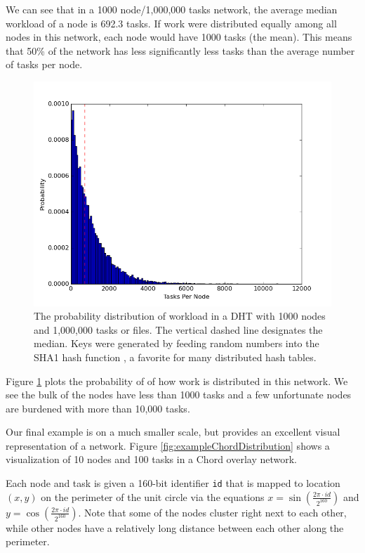 \documentclass[10pt,conference]{IEEEtran}
\begin{document}
We can see  that in a 1000 node/1,000,000 tasks network, the average median workload of a node is 692.3 tasks. 
If work were distributed equally among all nodes in this network, each node would have 1000 tasks (the mean).
This means that 50\% of the network has less significantly less tasks than the average number of tasks per node.




\begin{figure}[h!]
	\centering
	\includegraphics[width=0.9\linewidth]{figs/workloadDistribution}
	\caption[Workload Distribution in a DHT]{The probability distribution of workload in a DHT with 1000 nodes and 1,000,000 tasks or files.  The vertical dashed line designates the median.  Keys were generated by feeding random numbers into the SHA1 hash function \cite{sha1}, a favorite for many distributed hash tables.}
	\label{fig:workloadDistribution}
\end{figure}

Figure \ref{fig:workloadDistribution} plots the probability of of how work is distributed in this network.
We see the bulk of the nodes have less than 1000 tasks and a few unfortunate nodes are burdened with more than 10,000 tasks.


Our final example is on a much smaller scale, but provides an excellent visual representation of a network.
Figure \ref{fig:exampleChordDistribution} shows a visualization of 10 nodes and 100 tasks in a Chord overlay network.

Each node and task is given a 160-bit identifier \texttt{id} that is mapped to location $ (x,y) $ on the perimeter of the unit circle via the equations $ x = \sin\left( \frac{ 2 \pi \cdot id}{2^{160}} \right)$ and $ y = \cos\left( \frac{ 2 \pi \cdot id}{2^{160}} \right)$. 
Note that some of the nodes cluster right next to each other, while other nodes have a relatively long distance between each other along the perimeter.  
\end{document}
